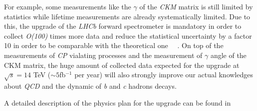 \documentclass[paper=a4, fontsize=10pt]{scrartcl}
\numberwithin{equation}{section}		%
\numberwithin{figure}{section}			%
\numberwithin{table}{section}				%
\begin{document}
For example, some measurements like the $\gamma$ of the \textit{CKM} matrix is still limited by statistics while lifetime measurements are already systematically limited. 
Due to this, the upgrade of the \textit{LHCb} forward spectrometer is mandatory in order to collect \textit{O(100)} times more data and reduce the statistical uncertainty by a factor 10 in order to be comparable with the theoretical one ~\cite{Blake2}~\cite{Blake3}. On top of the measurements of \textit{CP} vialating processes and the measurement of $\gamma$ angle of the CKM matrix, the huge amount of collected data expected for the upgrade at $\sqrt{s} = 14$ TeV ($\sim 5$fb$^{-1}$ per year) will also strongly improve our actual knowledges about \textit{QCD} and the dynamic of \textit{b} and \textit{c} hadrons decays. 

A detailed description of the physics plan for the upgrade can be found in ~\cite{Blake2}
\end{document}
